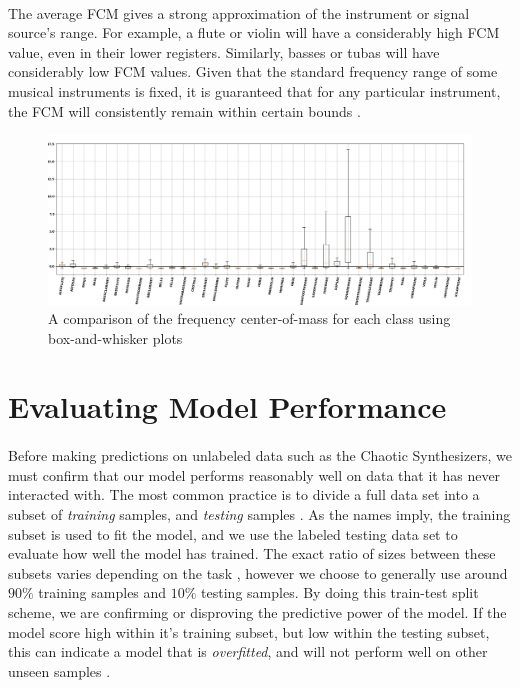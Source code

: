 \documentclass[12pt,letterpaper]{article}
\begin{document}
\paragraph*{}The average FCM gives a strong approximation of the instrument or signal source's range. For example, a flute or violin will have a considerably high FCM value, even in their lower registers. Similarly, basses or tubas will have considerably low FCM values. Given that the standard frequency range of some musical instruments is fixed, it is guaranteed that for any particular instrument, the FCM will consistently remain within certain bounds \cite{Olson,White}.

\begin{figure}[H]
\label{fig-FeatureFCM}
\begin{center}
\includegraphics[scale=0.3]{../FiguresFeatures/FCM}
\end{center}
\caption{A comparison of the frequency center-of-mass for each class using box-and-whisker plots}
\end{figure}


\newpage
\section{Evaluating Model Performance}
\label{sec-PerfEval}

\paragraph*{}Before making predictions on unlabeled data such as the Chaotic Synthesizers, we must confirm that our model performs reasonably well on data that it has never interacted with. The most common practice is to divide a full data set into a subset of \textit{training} samples, and \textit{testing} samples \cite{Geron}. As the names imply, the training subset is used to fit the model, and we use the labeled testing data set to evaluate how well the model has trained. The exact ratio of sizes between these subsets varies depending on the task \cite{Goodfellow,Geron2,Mitchell}, however we choose to generally use around $90\%$ training samples and $10\%$ testing samples. By doing this train-test split scheme, we are confirming or disproving the predictive power of the model. If the model score high within it's training subset, but low within the testing subset, this can indicate a model that is \textit{overfitted}, and will not perform well on other unseen samples \cite{Geron}.
\end{document}
